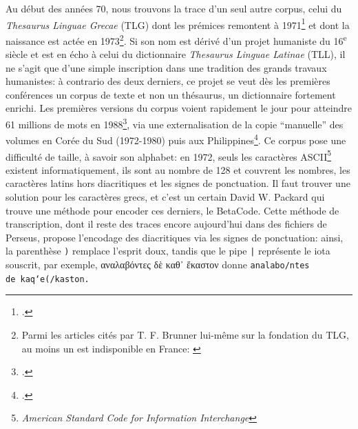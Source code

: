 Au début des années 70, nous trouvons la trace d'un seul autre corpus, celui du \textit{Thesaurus Linguae Grecae} (TLG) dont les prémices remontent à 1971\footcite{brunner_classics_1993} et dont la naissance est actée en 1973\footnote{Parmi les articles cités par T. F. Brunner lui-même sur la fondation du TLG, au moins un est indisponible en France: \cite{hugues_homer_1987}}. Si son nom est dérivé d'un projet humaniste du 16\textsuperscript{e} siècle et est en écho à celui du dictionnaire \textit{Thesaurus Linguae Latinae} (TLL), il ne s'agit que d'une simple inscription dans une tradition des grands travaux humanistes: à contrario des deux derniers, ce projet se veut dès les premières conférences un corpus de texte et non un thésaurus, un dictionnaire fortement enrichi. Les premières versions du corpus voient rapidement le jour pour atteindre 61 millions de mots en 1988\footcite{brunner_overcoming_1988}, via une externalisation de la copie \enquote{manuelle} des volumes en Corée du Sud (1972-1980) puis aux Philippines\footcite[p. 111]{helgerson_cd-rom_1988}. Ce corpus pose une difficulté de taille, à savoir son alphabet: en 1972, seuls les caractères ASCII\footnote{\textit{American Standard Code for Information Interchange}} existent informatiquement, ils sont au nombre de 128 et couvrent les nombres, les caractères latins hors diacritiques et les signes de ponctuation. Il faut trouver une solution pour les caractères grecs, et c'est un certain David W. Packard qui trouve une méthode pour encoder ces derniers, le BetaCode. Cette méthode de transcription, dont il reste des traces encore aujourd'hui dans des fichiers de Perseus, propose l'encodage des diacritiques via les signes de ponctuation: ainsi, la parenthèse \texttt{)} remplace l'esprit doux, tandis que le pipe \texttt{|} représente le iota souscrit, par exemple, \textgreek{αναλαβόντες δὲ καθ᾽ ἕκαστον} donne \texttt{analabo/ntes de\ kaq`e(/kaston.}



